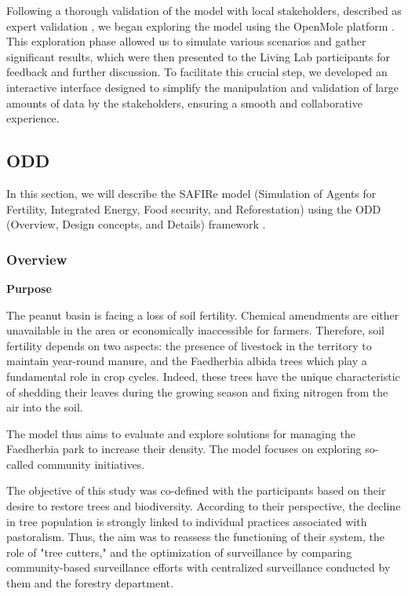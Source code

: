 \documentclass{article}
\begin{document}
Following a thorough validation of the model with local stakeholders, described as expert validation \cite{bommel_definition_2009}, we began exploring the model using the OpenMole platform \cite{reuillon_openmole_2013}. This exploration phase allowed us to simulate various scenarios and gather significant results, which were then presented to the Living Lab participants for feedback and further discussion. To facilitate this crucial step, we developed an interactive interface designed to simplify the manipulation and validation of large amounts of data by the stakeholders, ensuring a smooth and collaborative experience.

\subsection{ODD }

In this section, we will describe the SAFIRe model (Simulation of Agents for Fertility, Integrated Energy, Food security, and Reforestation) using the ODD (Overview, Design concepts, and Details) framework \cite{grimm_standard_2006,grimm_odd_2010,grimm_odd_2020}.


    \subsubsection{Overview}

        \textbf{Purpose}

        The peanut basin is facing a loss of soil fertility. Chemical amendments are either unavailable in the area or economically inaccessible for farmers. Therefore, soil fertility depends on two aspects: the presence of livestock in the territory to maintain year-round manure, and the Faedherbia albida trees which play a fundamental role in crop cycles. Indeed, these trees have the unique characteristic of shedding their leaves during the growing season and fixing nitrogen from the air into the soil.

        The model thus aims to evaluate and explore solutions for managing the Faedherbia park to increase their density. The model focuses on exploring so-called community initiatives.

        The objective of this study was co-defined with the participants based on their desire to restore trees and biodiversity. According to their perspective, the decline in tree population is strongly linked to individual practices associated with pastoralism. Thus, the aim was to reassess the functioning of their system, the role of "tree cutters," and the optimization of surveillance by comparing community-based surveillance efforts with centralized surveillance conducted by them and the forestry department.\\
\end{document}
